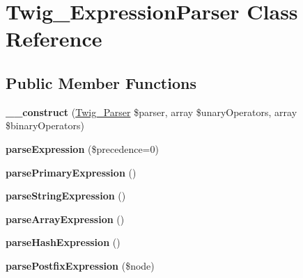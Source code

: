 \hypertarget{classTwig__ExpressionParser}{}\section{Twig\+\_\+\+Expression\+Parser Class Reference}
\label{classTwig__ExpressionParser}
\subsection*{Public Member Functions}
\begin{DoxyCompactItemize}
\item 
{\bfseries \+\_\+\+\_\+construct} (\hyperlink{classTwig__Parser}{Twig\+\_\+\+Parser} \$parser, array \$unary\+Operators, array \$binary\+Operators)\hypertarget{classTwig__ExpressionParser_af5b20e106c32b3584b0570e8edc38b0e}{}\label{classTwig__ExpressionParser_af5b20e106c32b3584b0570e8edc38b0e}

\item 
{\bfseries parse\+Expression} (\$precedence=0)\hypertarget{classTwig__ExpressionParser_a83fd6d4dbf90be2d07fe78b6e332c3f4}{}\label{classTwig__ExpressionParser_a83fd6d4dbf90be2d07fe78b6e332c3f4}

\item 
{\bfseries parse\+Primary\+Expression} ()\hypertarget{classTwig__ExpressionParser_a56518225e19be21558e853c204e8b53b}{}\label{classTwig__ExpressionParser_a56518225e19be21558e853c204e8b53b}

\item 
{\bfseries parse\+String\+Expression} ()\hypertarget{classTwig__ExpressionParser_a3e96671f7766b3374873f9e7da1e8a38}{}\label{classTwig__ExpressionParser_a3e96671f7766b3374873f9e7da1e8a38}

\item 
{\bfseries parse\+Array\+Expression} ()\hypertarget{classTwig__ExpressionParser_a54b28ca8b43d72972da95658024e0b7f}{}\label{classTwig__ExpressionParser_a54b28ca8b43d72972da95658024e0b7f}

\item 
{\bfseries parse\+Hash\+Expression} ()\hypertarget{classTwig__ExpressionParser_a2200f99d47eb8787cbf3b43cd8f5fd77}{}\label{classTwig__ExpressionParser_a2200f99d47eb8787cbf3b43cd8f5fd77}

\item 
{\bfseries parse\+Postfix\+Expression} (\$node)\hypertarget{classTwig__ExpressionParser_a72e5035f242d7fbfc24629a99874d8b1}{}\label{classTwig__ExpressionParser_a72e5035f242d7fbfc24629a99874d8b1}


\end{DoxyCompactItemize}
